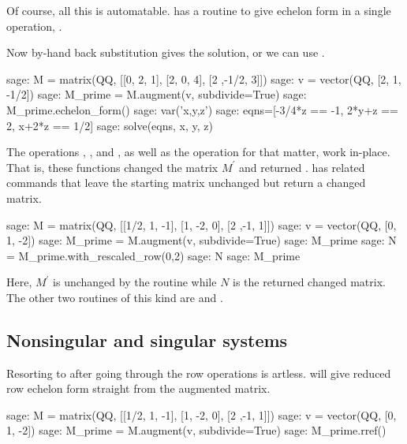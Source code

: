 Of course, all this is automatable. 
\Sage{} has a routine to give echelon form in a single operation,
.

Now by-hand back substitution gives the solution, or we can 
use .
\begin{sagecommandline}
sage: M = matrix(QQ, [[0, 2, 1], [2, 0, 4], [2 ,-1/2, 3]])
sage: v = vector(QQ, [2, 1, -1/2])                        
sage: M_prime = M.augment(v, subdivide=True)
sage: M_prime.echelon_form()              
sage: var('x,y,z')
sage: eqns=[-3/4*z == -1, 2*y+z == 2, x+2*z == 1/2]
sage: solve(eqns, x, y, z)
\end{sagecommandline}

The operations ,
, and ,
as well as the operation  for that matter,
work in-place. 
That is, these functions changed the matrix $M^\prime$
and returned .
\Sage{} has related commands that leave the starting matrix unchanged
but return a changed matrix.
\begin{sagecommandline}
sage: M = matrix(QQ, [[1/2, 1, -1], [1, -2, 0], [2 ,-1, 1]])
sage: v = vector(QQ, [0, 1, -2])
sage: M_prime = M.augment(v, subdivide=True) 
sage: M_prime
sage: N = M_prime.with_rescaled_row(0,2)
sage: N      
sage: M_prime
\end{sagecommandline}
\noindent
Here, $M^\prime$ is unchanged by the routine while $N$ is the returned 
changed matrix.
The other two routines of this kind are  
and .




\subsection{Nonsingular and singular systems}
Resorting to  after going through the row operations is artless.
\Sage{} will give reduced row echelon form straight from the augmented matrix.
\begin{sagecommandline}
sage: M = matrix(QQ, [[1/2, 1, -1], [1, -2, 0], [2 ,-1, 1]])
sage: v = vector(QQ, [0, 1, -2])
sage: M_prime = M.augment(v, subdivide=True) 
sage: M_prime.rref()
\end{sagecommandline}

